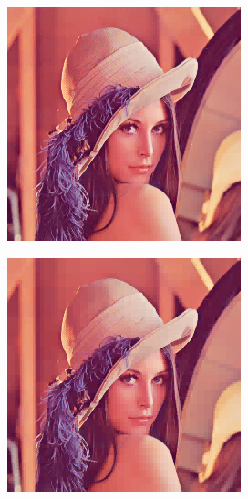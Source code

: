 \documentclass[11pt]{report}
\theoremstyle{plain}
\theoremstyle{remark}
\begin{document}
\begin{figure}
	\centering
	\begin{subfigure}[b]{0.24\textwidth}
		\centering
		\includegraphics[width=\textwidth]{plaatjes/Lenna_haar_0_2.png}
	\end{subfigure}
	\begin{subfigure}[b]{0.24\textwidth}
		\centering
		\includegraphics[width=\textwidth]{plaatjes/Lenna_haar_0_1.png}

\end{subfigure}
\end{figure}
\end{document}
